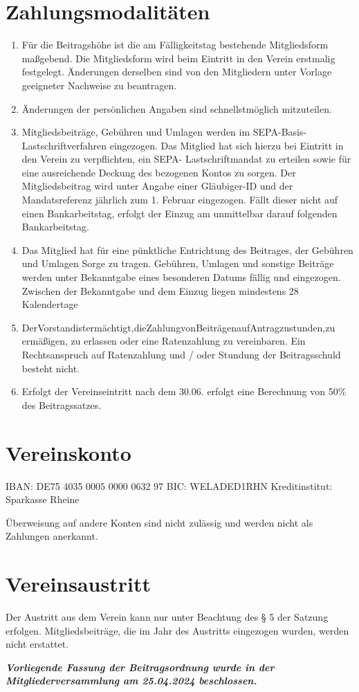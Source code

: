 \documentclass[12pt]{article}
\begin{document}
\section{Zahlungsmodalitäten}
\begin{enumerate}[label=(\arabic*)]
	\item Für die Beitragshöhe ist die am Fälligkeitstag bestehende Mitgliedsform maßgebend. Die
	      Mitgliedsform wird beim Eintritt in den Verein erstmalig festgelegt. Änderungen derselben
	      sind von den Mitgliedern unter Vorlage geeigneter Nachweise zu beantragen.
	\item Änderungen der persönlichen Angaben sind schnellstmöglich mitzuteilen.
	\item Mitgliedsbeiträge, Gebühren und Umlagen werden im SEPA-Basis-Lastschriftverfahren
	      eingezogen. Das Mitglied hat sich hierzu bei Eintritt in den Verein zu verpflichten, ein SEPA- Lastschriftmandat zu erteilen sowie für eine ausreichende Deckung des bezogenen Kontos zu sorgen.
	      Der Mitgliedsbeitrag wird unter Angabe einer Gläubiger-ID und der Mandatsreferenz jährlich zum 1. Februar eingezogen. Fällt dieser nicht auf einen Bankarbeitstag, erfolgt der Einzug am unmittelbar darauf folgenden Bankarbeitstag.
	\item Das Mitglied hat für eine pünktliche Entrichtung des Beitrages, der Gebühren und Umlagen Sorge zu tragen. Gebühren, Umlagen und sonstige Beiträge werden unter Bekanntgabe eines besonderen Datums fällig und eingezogen. Zwischen der Bekanntgabe und dem Einzug liegen mindestens 28 Kalendertage
	\item DerVorstandistermächtigt,dieZahlungvonBeiträgenaufAntragzustunden,zu ermäßigen, zu erlassen oder eine Ratenzahlung zu vereinbaren. Ein Rechtsanspruch auf Ratenzahlung und / oder Stundung der Beitragsschuld besteht nicht.
	\item Erfolgt der Vereinseintritt nach dem 30.06. erfolgt eine Berechnung von 50\% des Beitragssatzes.
\end{enumerate}

\section{Vereinskonto}


IBAN: DE75 4035 0005 0000 0632 97
BIC: WELADED1RHN
Kreditinstitut: Sparkasse Rheine

Überweisung auf andere Konten sind nicht zulässig und werden nicht als Zahlungen anerkannt.

\section{Vereinsaustritt}
Der Austritt aus dem Verein kann nur unter Beachtung des § 5 der Satzung erfolgen. Mitgliedsbeiträge, die im Jahr des Austritts eingezogen wurden, werden nicht erstattet.


\textbf{\textit{Vorliegende Fassung der Beitragsordnung wurde in der Mitgliederversammlung am 25.04.2024 beschlossen.}}
\end{document}
